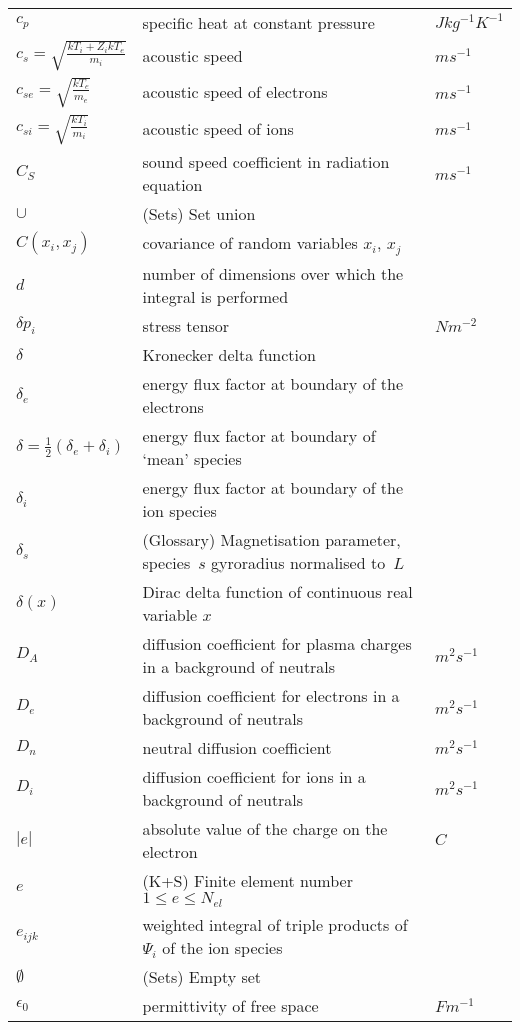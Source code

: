 \begin{longtable}{|p{3.0cm}|p{10.0cm}|p{3.0cm}|}
$c_p$ & specific heat at constant pressure  &  $J kg^{-1} K^{-1}$ \\
$c_s = \sqrt{\frac{kT_i + {Z_i} kT_e}{{m_i}}}$ & acoustic speed  &  $m s^{-1}$ \\
$c_{se} = \sqrt{\frac{kT_e}{{m_e}}}$ & acoustic speed of electrons  &  $m s^{-1}$ \\
$c_{si} = \sqrt{\frac{kT_i}{{m_i}}}$ & acoustic speed of ions  &  $m s^{-1}$ \\
$C_S$ & sound speed coefficient in radiation equation  &  $m s^{-1}$ \\
$\cup$ &  (Sets) Set union & \\
$C(x_i, x_j)$ & covariance of random variables $x_i$, $x_j$  & \\
$d$ & number of dimensions over which the integral is performed  & \\
$\delta p_i$ & stress tensor  & $N m^{-2}$ \\
$\delta$ & Kronecker delta function & \\
$\delta_e$ & energy flux factor at boundary of the electrons  & \\
$\delta=\frac{1}{2}(\delta_e+\delta_i)$ & energy flux factor at boundary of `mean' species  & \\
$\delta_i$ & energy flux factor at boundary of the ion species  & \\
$\delta_s$ & (Glossary) Magnetisation  parameter, species~$s$  gyroradius normalised to~$L$ & \\
$\delta(x)$ & Dirac delta function of continuous real variable $x$  & \\
$D_A$ & diffusion coefficient for plasma charges in a background of neutrals  &  $m^2 s^{-1}$ \\
$D_e$ & diffusion coefficient for electrons in a background of neutrals  &  $m^2 s^{-1}$ \\
$D_n$ & neutral diffusion coefficient  &  $m^2 s^{-1}$ \\
$D_i$ & diffusion coefficient for ions in a background of neutrals  &  $m^2 s^{-1}$ \\
$|e|$ & absolute value of the charge on the electron & $C$ \\
$e$ &  (K+S) Finite element number $1 \leq e \leq N_{el}$ & \\
$e_{ijk}$ & weighted integral of triple products of $\Psi_i$ of the ion species & \\
$\emptyset$ &  (Sets) Empty set & \\
$\epsilon_0$ & permittivity of free space  &  $F m^{-1}$ \\

\end{longtable}
